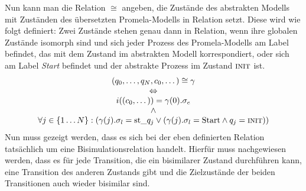 Nun kann man die Relation $\cong$ angeben, die Zustände des abstrakten Modells mit Zuständen des übersetzten Promela-Modells in Relation setzt.
Diese wird wie folgt definiert:
Zwei Zustände stehen genau dann in Relation, wenn ihre globalen Zustände isomorph sind und sich jeder Prozess des Promela-Modells am Label befindet, das mit dem Zustand im abstrakten Modell korrespondiert, oder sich am Label \emph{Start} befindet und der abstrakte Prozess im Zustand $\textnormal{\scshape init}$ ist.
\[
\begin{array}{c}
  (q_0,\dots,q_N,c_0,\dots)\cong \gamma\\
  \Leftrightarrow\\
  i((c_0,\dots))=\gamma(0).\sigma_e\\
  \land\\
  \forall j\in\{1\dots N\}: (\gamma(j).\sigma_l = \textrm{st\_}q_j \lor (\gamma(j).\sigma_l = \textrm{Start}\land q_j=\const{init}))
\end{array}
\]
Nun muss gezeigt werden, dass es sich bei der eben definierten Relation tatsächlich um eine Bisimulationsrelation handelt.
Hierfür muss nachgewiesen werden, dass es für jede Transition, die ein bisimilarer Zustand durchführen kann, eine Transition des anderen Zustands gibt und die Zielzustände der beiden Transitionen auch wieder bisimilar sind.

